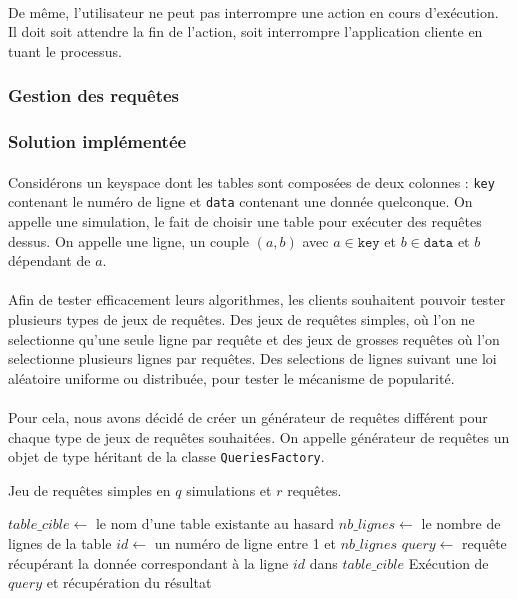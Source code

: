 \documentclass[12pt]{article}
\newcommand{\class}[1]{\texttt{#1}}
\begin{document}
\paragraph{} De même, l'utilisateur ne peut pas interrompre une action en cours d'exécution. Il doit soit attendre la fin de l'action, soit interrompre l'application cliente en tuant le processus.

\subsubsection{Gestion des requêtes}

\subsubsection*{Solution implémentée}

\paragraph{} Considérons un keyspace dont les tables sont composées de deux colonnes : \texttt{key} contenant le numéro de ligne et \texttt{data} contenant une donnée quelconque.
On appelle une simulation, le fait de choisir une table pour exécuter des requêtes dessus. On appelle une ligne, un couple $(a,b)$ avec $a \in \texttt{key}$ et $b \in \texttt{data}$ et $b$ dépendant de $a$.

\paragraph{}Afin de tester efficacement leurs algorithmes, les clients souhaitent pouvoir tester plusieurs types de jeux de requêtes. 
Des jeux de requêtes simples, où l'on ne selectionne qu'une seule ligne par requête et des jeux de grosses requêtes où l'on selectionne plusieurs lignes par requêtes.
Des selections de lignes suivant une loi aléatoire uniforme ou distribuée, pour tester le mécanisme de popularité.

\paragraph{} Pour cela, nous avons décidé de créer un générateur de requêtes différent pour chaque type de jeux de requêtes souhaitées.
On appelle générateur de requêtes un objet de type héritant de la classe \class{QueriesFactory}.




\begin{algorithm}[H]
\caption{Jeu de requêtes simples en $q$ simulations et $r$ requêtes.}
\begin{algorithmic}[1]
\State $table\_cible \gets $ le nom d'une table existante au hasard
\State $nb\_lignes \gets $ le nombre de lignes de la table
\State $id \gets $ un numéro de ligne entre 1 et $nb\_lignes$ 
\State $query \gets$ requête récupérant la donnée correspondant à la ligne $id$ dans $table\_cible$
\State Exécution de $query$ et récupération du résultat
\EndFor
\EndFor
\end{algorithmic}
\end{algorithm}
\end{document}
